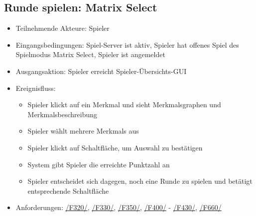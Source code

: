 \documentclass[a4paper]{scrreprt}
\begin{document}
    \subsection{Runde spielen: Matrix Select}
    \begin{itemize}
    	\item Teilnehmende Akteure: \Gls{Spieler}

    	\item Eingangsbedingungen: \Gls{Spiel-Server} ist aktiv, \Gls{Spieler} hat offenes \Gls{Spiel} des \Gls{Spielmodus} Matrix Select, \Gls{Spieler} ist angemeldet
        \item Ausgangsaktion: \Gls{Spieler} erreicht Spieler-Übersichts-GUI
    	\item Ereignisfluss:
    	\begin{itemize}
    		\item \Gls{Spieler} klickt auf ein \Gls{Merkmal} und sieht Merkmalsgraphen und Merkmalsbeschreibung
    		\item \Gls{Spieler} wählt mehrere \Glspl{Merkmal} aus
    		\item \Gls{Spieler} klickt auf Schaltfläche, um Auswahl zu bestätigen
    		\item System gibt \Gls{Spieler} die erreichte Punktzahl an
    		\item \Gls{Spieler} entscheidet sich dagegen, noch eine Runde zu spielen und betätigt entsprechende Schaltfläche
    	\end{itemize}
        \item Anforderungen: \hyperlink{F320}{/F320/}, \hyperlink{F330}{/F330/}, \hyperlink{F350}{/F350/}, \hyperlink{F400}{/F400/} - \hyperlink{F430}{/F430/}, \hyperlink{F660}{/F660/}

    \end{itemize}
	
\end{document}
